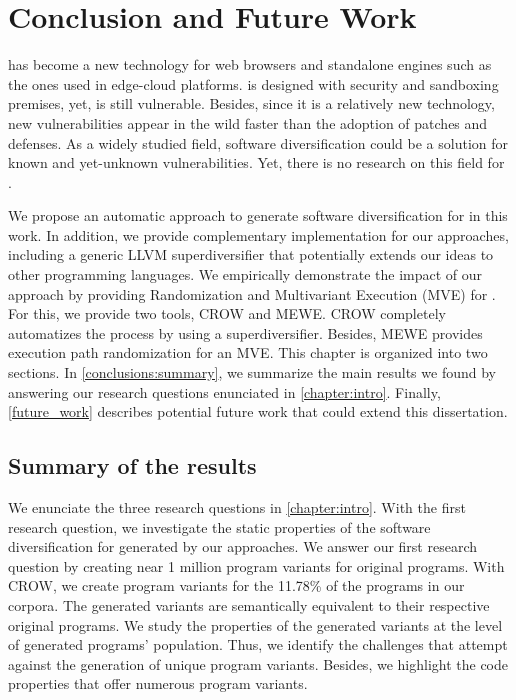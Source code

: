 \chapter{Conclusion and Future Work}
\label{chapter:conclude}

\wasm has become a new technology for web browsers and standalone engines such as the ones used in edge-cloud platforms. \wasm is designed with security and sandboxing premises, yet, is still vulnerable.
Besides, since it is a relatively new technology, new vulnerabilities appear in the wild faster than the adoption of patches and defenses.
As a widely studied field, software diversification could be a solution for known and yet-unknown vulnerabilities. Yet, there is no research on this field for \wasm.

We propose an automatic approach to generate software diversification for \wasm in this work. 
In addition, we provide complementary implementation for our approaches, including a generic LLVM superdiversifier that potentially extends our ideas to other programming languages.
We empirically demonstrate the impact of our approach by providing Randomization and Multivariant Execution (MVE) for \wasm.
For this, we provide two tools, CROW and MEWE. CROW completely automatizes the process by using a superdiversifier. Besides, MEWE provides execution path randomization for an MVE.
This chapter is organized into two sections. 
In \autoref{conclusions:summary}, we summarize the main results we found by answering our research questions enunciated in \autoref{chapter:intro}.
Finally, \autoref{future_work} describes potential future work that could extend this dissertation.

\section{Summary of the results}
\label{conclusions:summary}

We enunciate the three research questions in \autoref{chapter:intro}. 
With the first research question, we investigate the static properties of the software diversification for \wasm generated by our approaches. 
We answer our first research question by creating near 1 million program variants for  original programs. 
With CROW, we create program variants for the 11.78\% of the programs in our corpora.
The generated variants are semantically equivalent to their respective original programs.
We study the properties of the generated variants at the level of generated programs' population.
Thus, we identify the challenges that attempt against the generation of unique program variants.
Besides, we highlight the code properties that offer numerous program variants. 

